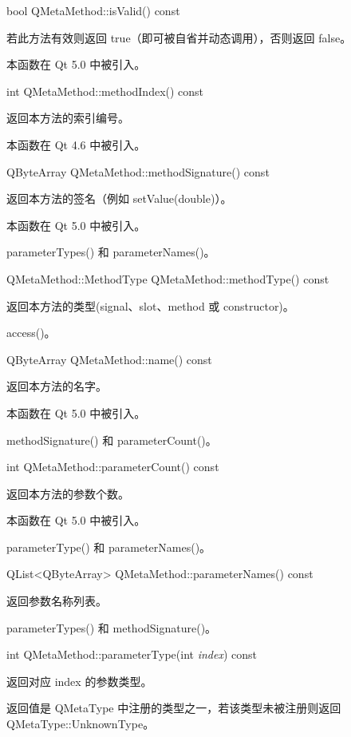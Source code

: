 bool QMetaMethod::isValid() const

若此方法有效则返回 true（即可被自省并动态调用），否则返回 false。

本函数在 Qt 5.0 中被引入。

int QMetaMethod::methodIndex() const

返回本方法的索引编号。

本函数在 Qt 4.6 中被引入。

QByteArray QMetaMethod::methodSignature() const

返回本方法的签名（例如 setValue(double)）。

本函数在 Qt 5.0 中被引入。

\begin{seeAlso}
parameterTypes() 和 parameterNames()。
\end{seeAlso}

QMetaMethod::MethodType QMetaMethod::methodType() const

返回本方法的类型(signal、slot、method 或 constructor)。

\begin{seeAlso}
access()。
\end{seeAlso}

QByteArray QMetaMethod::name() const

返回本方法的名字。

本函数在 Qt 5.0 中被引入。

\begin{seeAlso}
methodSignature() 和 parameterCount()。
\end{seeAlso}

int QMetaMethod::parameterCount() const

返回本方法的参数个数。

本函数在 Qt 5.0 中被引入。

\begin{seeAlso}
parameterType() 和 parameterNames()。
\end{seeAlso}

QList<QByteArray> QMetaMethod::parameterNames() const

返回参数名称列表。

\begin{seeAlso}
parameterTypes() 和 methodSignature()。
\end{seeAlso}

int QMetaMethod::parameterType(int \emph{index}) const

返回对应 index 的参数类型。

返回值是 QMetaType 中注册的类型之一，若该类型未被注册则返回 QMetaType::UnknownType。

